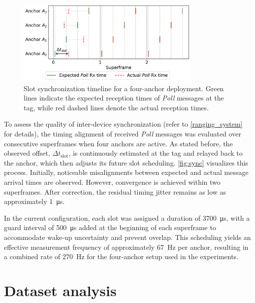 \begin{figure}[tbh]
    \centering
    \includegraphics[width=0.8\textwidth]{Graphics/sync_visualize.pdf}
    \caption[Slot synchronization timeline for a four-anchor deployment.]{Slot synchronization timeline for a four-anchor deployment. Green lines indicate the expected reception times of \textit{Poll} messages at the tag, while red dashed lines denote the actual reception times.}
    \label{fig:sync}
\end{figure}

To assess the quality of inter-device synchronization (refer to \autoref{ranging_system} for details), the timing alignment of received \textit{Poll} messages was evaluated over consecutive superframes when four anchors are active. As stated before, the observed offset, $\Delta t_{\text{slot}}$, is continuously estimated at the tag and relayed back to the anchor, which then adjusts its future slot scheduling. \autoref{fig:sync} visualizes this process. Initially, noticeable misalignments between expected and actual message arrival times are observed. However, convergence is achieved within two superframes. After correction, the residual timing jitter remains as low as approximately \SI{1}{\micro\second}.

In the current configuration, each slot was assigned a duration of \SI{3700}{\micro\second}, with a guard interval of \SI{500}{\micro\second} added at the beginning of each superframe to accommodate wake-up uncertainty and prevent overlap. This scheduling yields an effective measurement frequency of approximately \SI{67}{\hertz} per anchor, resulting in a combined rate of \SI{270}{\hertz} for the four-anchor setup used in the experiments.

\section{Dataset analysis}

